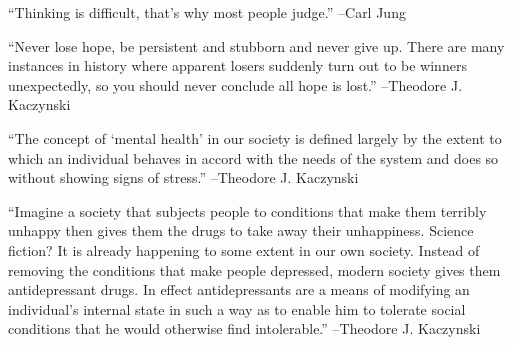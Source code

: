 \documentclass{article}%
\begin{document}
\linebreak%
\vspace{1mm}%
\begin{minipage}{\textwidth}%
\flushleft%
“Thinking is difficult, that's why most people judge.”%
\linebreak%
\vspace{1mm}%
–Carl Jung%
\linebreak%
\vspace{1mm}%
\end{minipage}%
\linebreak%
\vspace{1mm}%
\begin{minipage}{\textwidth}%
\flushleft%
“Never lose hope, be persistent and stubborn and never give up. There are many instances in history where apparent losers suddenly turn out to be winners unexpectedly, so you should never conclude all hope is lost.”%
\linebreak%
\vspace{1mm}%
–Theodore J. Kaczynski%
\linebreak%
\vspace{1mm}%
\end{minipage}%
\linebreak%
\vspace{1mm}%
\begin{minipage}{\textwidth}%
\flushleft%
“The concept of ‘mental health’ in our society is defined largely by the extent to which an individual behaves in accord with the needs of the system and does so without showing signs of stress.”%
\linebreak%
\vspace{1mm}%
–Theodore J. Kaczynski%
\linebreak%
\vspace{1mm}%
\end{minipage}%
\linebreak%
\vspace{1mm}%
\begin{minipage}{\textwidth}%
\flushleft%
“Imagine a society that subjects people to conditions that make them terribly unhappy then gives them the drugs to take away their unhappiness. Science fiction? It is already happening to some extent in our own society. Instead of removing the conditions that make people depressed, modern society gives them antidepressant drugs. In effect antidepressants are a means of modifying an individual's internal state in such a way as to enable him to tolerate social conditions that he would otherwise find intolerable.”%
\linebreak%
\vspace{1mm}%
–Theodore J. Kaczynski%
\linebreak%
\vspace{1mm}%
\end{minipage}%
\end{document}
